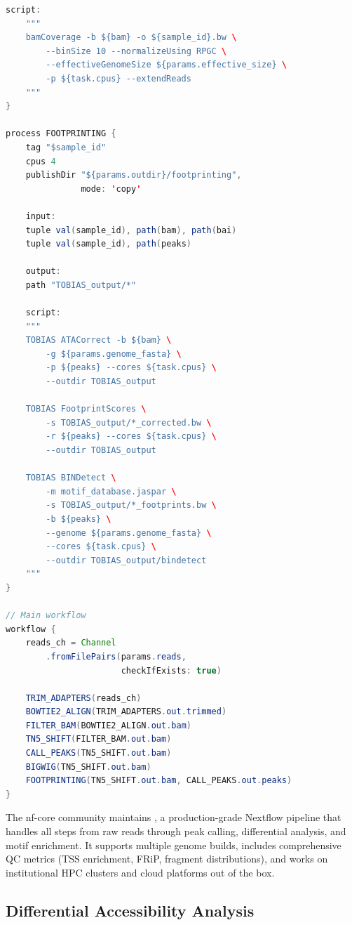 \begin{lstlisting}[language=Java, caption={Nextflow DSL2 workflow for ATAC-seq analysis.}, label={lst:chromatin:nextflow}]
    script:
    """
    bamCoverage -b ${bam} -o ${sample_id}.bw \
        --binSize 10 --normalizeUsing RPGC \
        --effectiveGenomeSize ${params.effective_size} \
        -p ${task.cpus} --extendReads
    """
}

process FOOTPRINTING {
    tag "$sample_id"
    cpus 4
    publishDir "${params.outdir}/footprinting",
               mode: 'copy'

    input:
    tuple val(sample_id), path(bam), path(bai)
    tuple val(sample_id), path(peaks)

    output:
    path "TOBIAS_output/*"

    script:
    """
    TOBIAS ATACorrect -b ${bam} \
        -g ${params.genome_fasta} \
        -p ${peaks} --cores ${task.cpus} \
        --outdir TOBIAS_output

    TOBIAS FootprintScores \
        -s TOBIAS_output/*_corrected.bw \
        -r ${peaks} --cores ${task.cpus} \
        --outdir TOBIAS_output

    TOBIAS BINDetect \
        -m motif_database.jaspar \
        -s TOBIAS_output/*_footprints.bw \
        -b ${peaks} \
        --genome ${params.genome_fasta} \
        --cores ${task.cpus} \
        --outdir TOBIAS_output/bindetect
    """
}

// Main workflow
workflow {
    reads_ch = Channel
        .fromFilePairs(params.reads,
                       checkIfExists: true)

    TRIM_ADAPTERS(reads_ch)
    BOWTIE2_ALIGN(TRIM_ADAPTERS.out.trimmed)
    FILTER_BAM(BOWTIE2_ALIGN.out.bam)
    TN5_SHIFT(FILTER_BAM.out.bam)
    CALL_PEAKS(TN5_SHIFT.out.bam)
    BIGWIG(TN5_SHIFT.out.bam)
    FOOTPRINTING(TN5_SHIFT.out.bam, CALL_PEAKS.out.peaks)
}
\end{lstlisting}

\begin{tipbox}
The nf-core community maintains , a production-grade Nextflow pipeline that handles all steps from raw reads through peak calling, differential analysis, and motif enrichment. It supports multiple genome builds, includes comprehensive QC metrics (TSS enrichment, FRiP, fragment distributions), and works on institutional HPC clusters and cloud platforms out of the box.
\end{tipbox}

\subsection{Differential Accessibility Analysis}
\label{subsec:chromatin:differential}

